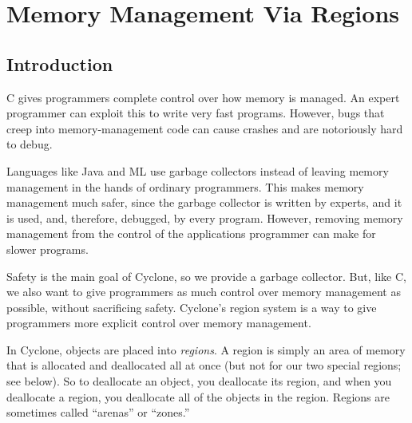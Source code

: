 \section{Memory Management Via Regions}
\label{sec:regions}


\subsection{Introduction}

C gives programmers complete control over how memory is managed.  An
expert programmer can exploit this to write very fast programs.
However, bugs that creep into memory-management code can cause
crashes and are notoriously hard to debug.

Languages like Java and ML use garbage collectors instead of leaving
memory management in the hands of ordinary programmers.  This makes
memory management much safer, since the garbage collector is written
by experts, and it is used, and, therefore, debugged, by every
program.  However, removing memory management from the control of the
applications programmer can make for slower programs.

Safety is the main goal of Cyclone, so we provide a garbage collector.
But, like C, we also want to give programmers as much control over
memory management as possible, without sacrificing safety.  Cyclone's
region system is a way to give programmers more explicit control over
memory management.

In Cyclone, objects are placed into \emph{regions}.  A region is simply an
area of memory that is allocated and deallocated all at once (but not for
our two special regions; see below).  So to deallocate an object, you
deallocate its region, and when you deallocate a region, you deallocate all
of the objects in the region.  Regions are sometimes called ``arenas'' or
``zones.''


